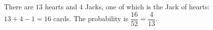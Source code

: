 There are $13$ hearts and $4$ Jacks, one of which is the Jack of hearts: $13+4-1=16$ cards. The probability is $\dfrac{16}{52}=\boxed{\dfrac4{13}}$.
